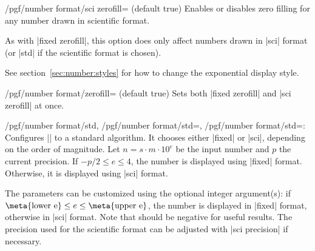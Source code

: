 \begin{key}{/pgf/number format/sci zerofill=  (default true)}
  Enables or disables zero filling for any number drawn in scientific
  format. 

\begin{codeexample}[]
\hspace{1em}
\hspace{1em}
\hspace{1em}
\hspace{1em}
\end{codeexample}
  As with |fixed zerofill|, this option does only affect numbers drawn
  in |sci| format (or |std| if the scientific format is chosen). 

  See section~\ref{sec:number:styles} for how to change the
  exponential display style. 
\end{key}

\begin{stylekey}{/pgf/number format/zerofill= (default true)}
  Sets both |fixed zerofill| and |sci zerofill| at once.
\end{stylekey}

\begin{keylist}{/pgf/number format/std,%
	/pgf/number format/std=,
	/pgf/number format/std=:}
  Configures |\pgfmathprintnumber| to a standard algorithm. It chooses
  either |fixed| or |sci|, depending on the order of magnitude. Let
  $n=s \cdot m \cdot 10^e$ be the input number and $p$ the current
  precision. If $-p/2 \le e \le 4$, the number is displayed using
  |fixed| format. Otherwise, it is displayed using |sci| format. 

\begin{codeexample}[]
\hspace{1em}
\hspace{1em}
\hspace{1em}
\hspace{1em}
\end{codeexample}
  The parameters can be customized using the optional integer
  argument(s): if $\text{\meta{lower e}} \le e \le \text{\meta{upper
      e}}$, the number is displayed in |fixed| format, otherwise in
  |sci| format. Note that  should be negative for useful
  results. The precision used for the scientific format can be
  adjusted with |sci precision| if necessary. 
\end{keylist}

